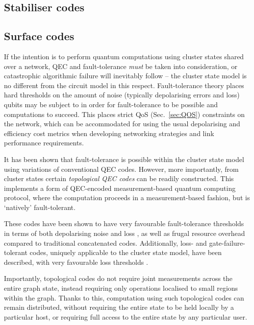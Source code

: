 %
%

\subsection{Stabiliser codes}\label{sec:stab_code}


%
%

\subsection{Surface codes}

If the intention is to perform quantum computations using cluster states shared over a network, QEC and fault-tolerance \textit{must} be taken into consideration, or catastrophic algorithmic failure will inevitably follow -- the cluster state model is no different from the circuit model in this respect. Fault-tolerance theory places hard thresholds on the amount of noise (typically depolarising errors and loss) qubits may be subject to in order for fault-tolerance to be possible and computations to succeed. This places strict QoS (Sec.~\ref{sec:QOS}) constraints on the network, which can be accommodated for using the usual depolarising and efficiency cost metrics when developing networking strategies and link performance requirements.

It has been shown that fault-tolerance is possible within the cluster state model \cite{bib:NielsenDawson04, bib:Dawson06} using variations of conventional QEC codes. However, more importantly, from cluster states certain \textit{topological QEC codes} \cite{???} can be readily constructed. This implements a form of QEC-encoded measurement-based quantum computing protocol, where the computation proceeds in a measurement-based fashion, but is `natively' fault-tolerant.

These codes have been shown to have very favourable fault-tolerance thresholds in terms of both depolarising noise and loss \cite{bib:StaceBarrettDohertyLoss, bib:BarrettStaceFT}, as well as frugal resource overhead compared to traditional concatenated codes. Additionally, loss- and gate-failure-tolerant codes, uniquely applicable to the cluster state model, have been described, with very favourable loss thresholds \cite{bib:Varnava05, bib:RalphHayes05, bib:Duan05}. 

Importantly, topological codes do not require joint measurements across the entire graph state, instead requiring only operations localised to small regions within the graph. Thanks to this, computation using such topological codes can remain distributed, without requiring the entire state to be held locally by a particular host, or requiring full access to the entire state by any particular user.

